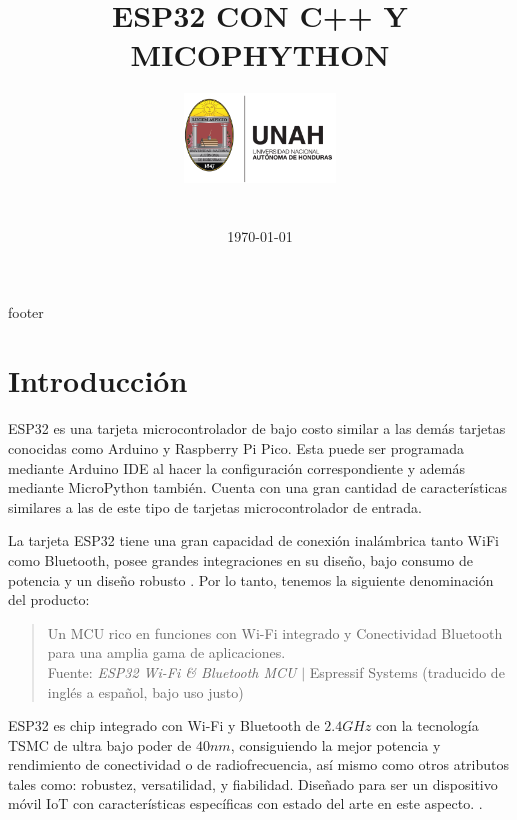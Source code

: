\documentclass[conference]{IEEEtran}
\title{ESP32 CON C++ Y MICOPHYTHON}
\author{
    \includegraphics[width = 40mm]{images/logo-unah}\\[8ex]
    \IEEEauthorblockN{Tobias Briones}
    \IEEEauthorblockN{tobias.briones@unah.hn}
    \IEEEauthorblockA{\textit{Universidad Nacional Autónoma de Honduras} \\
    \textit{Ingeniería de Sistemas} \\
    \textit{I PAC 2022} \\
    \textit{IS911-MICROPROCESADORES}} \\\vspace*{20pt} \normalsize  \\
    \today
}
\begin{document}
    \maketitle

    \begin{abstract}

    \end{abstract}

    \tableofcontents

    {footer}

    \section{Introducción}\label{sec:introduction}

    ESP32 es una tarjeta microcontrolador de bajo costo \cite{wikipedia-esp32-2022} similar a las demás tarjetas conocidas como Arduino y Raspberry Pi Pico. Esta puede ser programada mediante Arduino IDE al hacer la configuración correspondiente y además mediante MicroPython también. Cuenta con una gran cantidad de características similares a las de este tipo de tarjetas microcontrolador de entrada.

    \bigbreak

    La tarjeta ESP32 tiene una gran capacidad de conexión inalámbrica tanto WiFi como Bluetooth, posee grandes integraciones en su diseño, bajo consumo de potencia y un diseño robusto \cite{espressif-systems-shanghai-co-ltd-2022A}. Por lo tanto, tenemos la siguiente denominación del producto:

    \bigbreak

    \begin{quote}
        Un MCU rico en funciones con Wi-Fi integrado y Conectividad Bluetooth para una amplia gama de aplicaciones.\\ \footnotesize
        Fuente: \textit{ESP32 Wi-Fi \& Bluetooth MCU} $\mid$ Espressif Systems \cite{espressif-systems-shanghai-co-ltd-2022A} (traducido de inglés a español, bajo uso justo)
    \end{quote}

    \bigbreak

    ESP32 es chip integrado con Wi-Fi y Bluetooth de $2.4GHz$ con la tecnología TSMC de ultra bajo poder de $40nm$, consiguiendo la mejor potencia y rendimiento de conectividad o de radiofrecuencia, así mismo como otros atributos tales como: robustez, versatilidad, y fiabilidad. Diseñado para ser un dispositivo móvil IoT con características específicas con estado del arte en este aspecto. \cite{espressif-systems-shanghai-co-ltd-2022B}.
\end{document}
